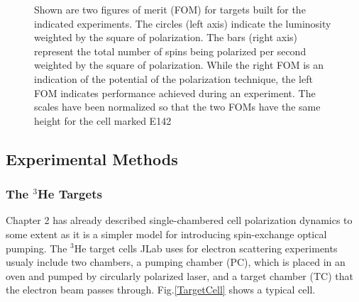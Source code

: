 \begin{figure}[t!]
	\centering
	\caption{{Shown are two figures of merit (FOM) for targets built for the indicated experiments.  The circles (left axis) indicate the luminosity weighted by the square of polarization.  The bars (right axis) represent the total number of spins being polarized per second weighted by the square of polarization.  While the right FOM is an indication of the potential of the polarization technique, the left FOM indicates performance achieved during an experiment. The scales have been normalized so that the two FOMs have the same height for the cell marked E142}}
	\label{fig:foms}
\end{figure}

\subsection{Experimental Methods}

\subsubsection{The $^{3}$He Targets}

Chapter 2 has already described single-chambered cell polarization dynamics to some extent as it is a simpler model for introducing spin-exchange optical pumping. The $^{3}$He target cells JLab uses for electron scattering experiments usualy include two chambers, a pumping chamber (PC), which is placed in an oven and pumped by circularly polarized laser, and a target chamber (TC) that the electron beam passes through. Fig.\ref{TargetCell} shows a typical cell. 

